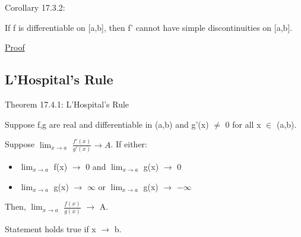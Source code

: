     \vspace{0.5cm}

{ \color{orange} Corollary 17.3.2:  }

    \begin{adjustbox}{minipage=14cm, right, vspace=0.1cm 0cm}
        If f is differentiable on [a,b], then f' cannot have simple discontinuities
        on [a,b].
    \end{adjustbox}

{ \color{magenta} \underline{Proof} }


\newpage





\subsection{ L'Hospital's Rule }

{ \color{red} Theorem 17.4.1: L'Hospital's Rule }

    \begin{adjustbox}{minipage=14cm, right, vspace=0.1cm 0cm}
        Suppose f,g are real and differentiable in (a,b) and g'(x) $\not =$ 0
        for all x $\in$ (a,b).
        
        Suppose $\lim_{x \rightarrow a}$ $\frac{f'(x)}{g'(x)} \rightarrow A$.
        If either:
        
        \begin{itemize}[leftmargin=1cm, itemsep=0.1cm]
            \item                        
                $\lim_{x \rightarrow a}$ f(x) $\rightarrow$ 0 and
                $\lim_{x \rightarrow a}$ g(x) $\rightarrow$ 0

            \item
                $\lim_{x \rightarrow a}$ g(x) $\rightarrow$ $\infty$ or
                $\lim_{x \rightarrow a}$ g(x) $\rightarrow$ $-\infty$
        \end{itemize}

        Then, $\lim_{x \rightarrow a}$ $\frac{f(x)}{g(x)}$ $\rightarrow$ A.

        Statement holds true if x $\rightarrow$ b.
    \end{adjustbox}

